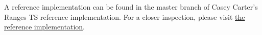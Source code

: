 \setcounter{chapter}{0}

A reference implementation can be found in the master branch of Casey Carter's Ranges TS reference
implementation. For a closer inspection, please visit
\href{https://github.com/CaseyCarter/cmcstl2/tree/master/include/stl2/detail/memory}{the reference implementation}.